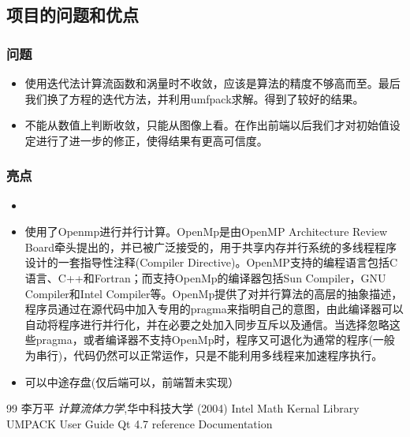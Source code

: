 \documentclass[12pt]{article}
\begin{document}
\subsection{项目的问题和优点}
\subsubsection{问题}
\begin{itemize}
\item 使用迭代法计算流函数和涡量时不收敛，应该是算法的精度不够高而至。最后我们换了方程的迭代方法，并利用umfpack求解。得到了较好的结果。
\item 不能从数值上判断收敛，只能从图像上看。在作出前端以后我们才对初始值设定进行了进一步的修正，使得结果有更高可信度。


\end{itemize}
\subsubsection{亮点}
\begin{itemize}
\item
\item 使用了Openmp进行并行计算。OpenMp是由OpenMP Architecture Review Board牵头提出的，并已被广泛接受的，用于共享内存并行系统的多线程程序设计的一套指导性注释(Compiler Directive)。OpenMP支持的编程语言包括C语言、C++和Fortran；而支持OpenMp的编译器包括Sun Compiler，GNU Compiler和Intel Compiler等。OpenMp提供了对并行算法的高层的抽象描述，程序员通过在源代码中加入专用的pragma来指明自己的意图，由此编译器可以自动将程序进行并行化，并在必要之处加入同步互斥以及通信。当选择忽略这些pragma，或者编译器不支持OpenMp时，程序又可退化为通常的程序(一般为串行)，代码仍然可以正常运作，只是不能利用多线程来加速程序执行。
\item 可以中途存盘(仅后端可以，前端暂未实现）

\end{itemize}


\begin{thebibliography}
{99}
  李万平
 \emph{计算流体力学},华中科技大学 
(2004)
Intel Math Kernal Library
UMPACK User Guide
Qt 4.7 reference Documentation



  \end{thebibliography}
\end{document}
